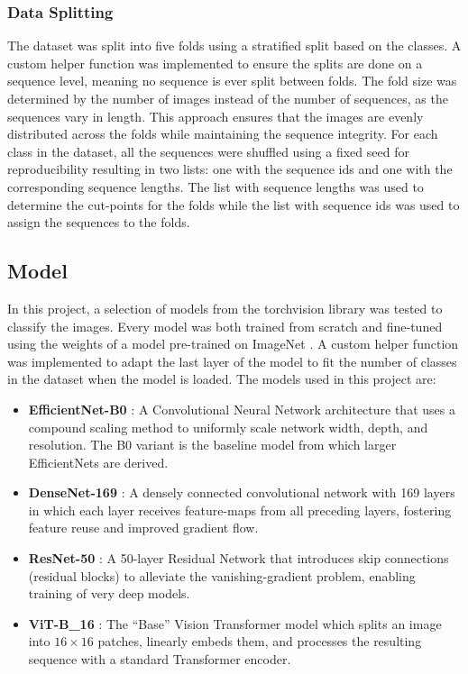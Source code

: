         \subsubsection{Data Splitting}
        The dataset was split into five folds using a stratified split based on the classes.
        A custom helper function was implemented to ensure the splits are done on a sequence level, meaning no sequence is ever split between folds.
        The fold size was determined by the number of images instead of the number of sequences, as the sequences vary in length.
        This approach ensures that the images are evenly distributed across the folds while maintaining the sequence integrity.
        For each class in the dataset, all the sequences were shuffled using a fixed seed for reproducibility resulting in two lists: one with the sequence ids and one with the corresponding sequence lengths.
        The list with sequence lengths was used to determine the cut-points for the folds while the list with sequence ids was used to assign the sequences to the folds.


    \subsection{Model}
    In this project, a selection of models from the torchvision library was tested to classify the images. 
    Every model was both trained from scratch and fine-tuned using the weights of a model pre-trained on ImageNet \autocite{dengImageNetLargescaleHierarchical2009}.
    A custom helper function was implemented to adapt the last layer of the model to fit the number of classes in the dataset when the model is loaded.
    The models used in this project are:

    \begin{itemize}
        \item \textbf{EfficientNet-B0} \autocite{tanEfficientNetRethinkingModel2019}:  
        A Convolutional Neural Network architecture that uses a compound scaling method to uniformly scale network width, depth, and resolution.  
        The B0 variant is the baseline model from which larger EfficientNets are derived.  

        \item \textbf{DenseNet-169} \autocite{huangDenselyConnectedConvolutional2017}:  
        A densely connected convolutional network with 169 layers in which each layer receives feature-maps from all preceding layers, fostering feature reuse and improved gradient flow.  

        \item \textbf{ResNet-50} \autocite{heDeepResidualLearning2016}:  
        A 50-layer Residual Network that introduces skip connections (residual blocks) to alleviate the vanishing-gradient problem, enabling training of very deep models.  

        \item \textbf{ViT-B\_16} \autocite{dosovitskiyImageWorth16x162021}:  
        The “Base” Vision Transformer model which splits an image into \(16\times 16\) patches, linearly embeds them, and processes the resulting sequence with a standard Transformer encoder.  
    \end{itemize}


